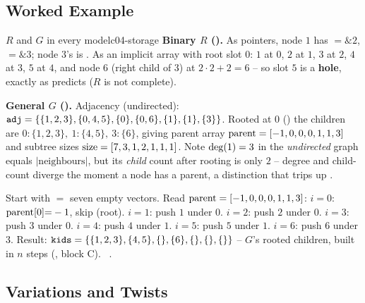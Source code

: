 \subsection{Worked Example}

\begin{example}{$R$ and $G$ in every model}{c04-storage}
\textbf{Binary $R$ ().} As pointers, node $1$ has 
$=\&2$,  $=\&3$; node $3$'s  is . As an
implicit array with root slot $0$: $1$ at $0$, $2$ at $1$, $3$ at $2$, $4$ at $3$, $5$ at
$4$, and node $6$ (right child of $3$) at $2\cdot2{+}2 = 6$ -- so slot $5$ is a
\textbf{hole}, exactly as  predicts ($R$ is not complete).

\medskip
\noindent\textbf{General $G$ ().} Adjacency (undirected):
$\texttt{adj} = \{\{1,2,3\},\{0,4,5\},\{0\},\{0,6\},\{1\},\{1\},\{3\}\}$. Rooted at $0$
() the children are $0{:}\{1,2,3\},\ 1{:}\{4,5\},\ 3{:}\{6\}$, giving
parent array $\operatorname{parent} = [-1,0,0,0,1,1,3]$ and subtree sizes $\operatorname{size}=[7,3,1,2,1,1,1]$. Note
$\operatorname{deg}(1)=3$ in the \emph{undirected} graph equals $|\text{neighbours}|$, but its
\emph{child} count after rooting is only $2$ -- degree and child-count diverge the moment
a node has a parent, a distinction that trips up .
\end{example}
\begin{tracebox}
Start with  $=$ seven empty vectors. Read $\operatorname{parent}=[-1,0,0,0,1,1,3]$:
$i{=}0$: $\operatorname{parent}[0]{=}-1$, skip (root). $i{=}1$: push $1$ under $0$. $i{=}2$: push $2$
under $0$. $i{=}3$: push $3$ under $0$. $i{=}4$: push $4$ under $1$. $i{=}5$: push $5$
under $1$. $i{=}6$: push $6$ under $3$. Result:
$\texttt{kids}=\{\{1,2,3\},\{4,5\},\{\},\{6\},\{\},\{\},\{\}\}$ -- $G$'s rooted
children, built in $n$ steps (, block C). \checkmark\ .
\end{tracebox}

\subsection{Variations and Twists}

